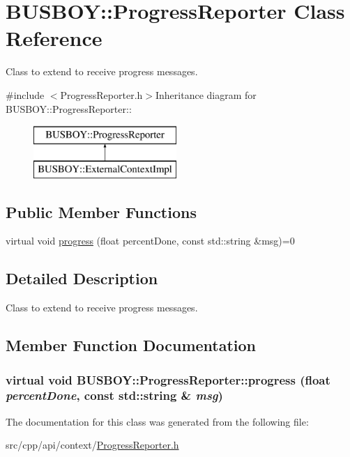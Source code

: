\hypertarget{classBUSBOY_1_1ProgressReporter}{
\section{BUSBOY::ProgressReporter Class Reference}
\label{classBUSBOY_1_1ProgressReporter}
}


Class to extend to receive progress messages.  


{\ttfamily \#include $<$ProgressReporter.h$>$}Inheritance diagram for BUSBOY::ProgressReporter::\begin{figure}[H]
\begin{center}
\leavevmode
\includegraphics[height=2cm]{classBUSBOY_1_1ProgressReporter}
\end{center}
\end{figure}
\subsection*{Public Member Functions}
\begin{DoxyCompactItemize}
\item 
virtual void \hyperlink{classBUSBOY_1_1ProgressReporter_a775fda25643cd4b41f1f26ea8a9fbeef}{progress} (float percentDone, const std::string \&msg)=0
\end{DoxyCompactItemize}


\subsection{Detailed Description}
Class to extend to receive progress messages. 

\subsection{Member Function Documentation}
\hypertarget{classBUSBOY_1_1ProgressReporter_a775fda25643cd4b41f1f26ea8a9fbeef}{
\subsubsection[{progress}]{\setlength{\rightskip}{0pt plus 5cm}virtual void BUSBOY::ProgressReporter::progress (float {\em percentDone}, \/  const std::string \& {\em msg})}}
\label{classBUSBOY_1_1ProgressReporter_a775fda25643cd4b41f1f26ea8a9fbeef}


The documentation for this class was generated from the following file:\begin{DoxyCompactItemize}
\item 
src/cpp/api/context/\hyperlink{ProgressReporter_8h}{ProgressReporter.h}\end{DoxyCompactItemize}
